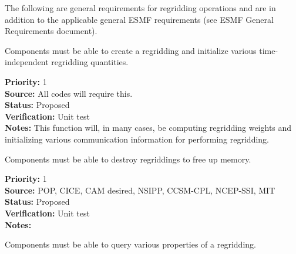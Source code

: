 


The following are general requirements for regridding operations and are in
addition to the applicable general ESMF requirements (see ESMF General
Requirements document).


Components must be able to create a regridding and initialize
various time-independent regridding quantities.

\begin{reqlist}
{\bf Priority:} 1 \\
{\bf Source:} All codes will require this. \\
{\bf Status:} Proposed \\
{\bf Verification:} Unit test \\
{\bf Notes:} This function will, in many cases, be computing
             regridding weights and initializing various
             communication information for performing regridding.
\end{reqlist}


Components must be able to destroy regriddings to free up memory.

\begin{reqlist}
{\bf Priority:} 1 \\
{\bf Source:} POP, CICE, CAM desired, NSIPP, CCSM-CPL, NCEP-SSI, MIT \\
{\bf Status:} Proposed \\
{\bf Verification:} Unit test \\
{\bf Notes:} 
\end{reqlist}


Components must be able to query various properties of a regridding.

